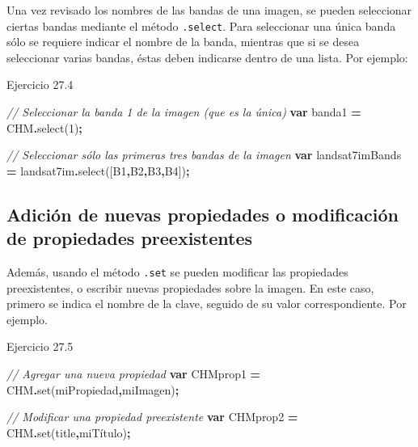 \documentclass[
  12pt,
  letterpaper,
  twoside]{book}
\newenvironment{Shaded}{\begin{snugshade}}{\end{snugshade}}
\newcommand{\CommentTok}[1]{\textcolor[rgb]{0.56,0.35,0.01}{\textit{#1}}}
\newcommand{\FunctionTok}[1]{\textcolor[rgb]{0.00,0.00,0.00}{#1}}
\newcommand{\KeywordTok}[1]{\textcolor[rgb]{0.13,0.29,0.53}{\textbf{#1}}}
\newcommand{\NormalTok}[1]{#1}
\newcommand{\OperatorTok}[1]{\textcolor[rgb]{0.81,0.36,0.00}{\textbf{#1}}}
\newcommand{\StringTok}[1]{\textcolor[rgb]{0.31,0.60,0.02}{#1}}
\begin{document}
Una vez revisado los nombres de las bandas de una imagen, se pueden seleccionar ciertas bandas mediante el método \texttt{.select}. Para seleccionar una única banda sólo se requiere indicar el nombre de la banda, mientras que si se desea seleccionar varias bandas, éstas deben indicarse dentro de una lista. Por ejemplo:

Ejercicio 27.4

\begin{Shaded}
\begin{Highlighting}[]
\CommentTok{// Seleccionar la banda 1 de la imagen (que es la única)}
\KeywordTok{var}\NormalTok{ banda1 }\OperatorTok{=}\NormalTok{ CHM}\OperatorTok{.}\FunctionTok{select}\NormalTok{(}\StringTok{\textquotesingle{}1\textquotesingle{}}\NormalTok{)}\OperatorTok{;}

\CommentTok{// Seleccionar sólo las primeras tres bandas de la imagen}
\KeywordTok{var}\NormalTok{ landsat7imBands }\OperatorTok{=}\NormalTok{ landsat7im}\OperatorTok{.}\FunctionTok{select}\NormalTok{([}\StringTok{\textquotesingle{}B1\textquotesingle{}}\OperatorTok{,}\StringTok{\textquotesingle{}B2\textquotesingle{}}\OperatorTok{,}\StringTok{\textquotesingle{}B3\textquotesingle{}}\OperatorTok{,}\StringTok{\textquotesingle{}B4\textquotesingle{}}\NormalTok{])}\OperatorTok{;}
\end{Highlighting}
\end{Shaded}

\hypertarget{adiciuxf3n-de-nuevas-propiedades-o-modificaciuxf3n-de-propiedades-preexistentes-1}{%
\subsection{Adición de nuevas propiedades o modificación de propiedades preexistentes}\label{adiciuxf3n-de-nuevas-propiedades-o-modificaciuxf3n-de-propiedades-preexistentes-1}}

Además, usando el método \texttt{.set} se pueden modificar las propiedades preexistentes, o escribir nuevas propiedades sobre la imagen. En este caso, primero se indica el nombre de la clave, seguido de su valor correspondiente. Por ejemplo.

Ejercicio 27.5

\begin{Shaded}
\begin{Highlighting}[]
\CommentTok{// Agregar una nueva propiedad}
\KeywordTok{var}\NormalTok{ CHMprop1 }\OperatorTok{=}\NormalTok{ CHM}\OperatorTok{.}\FunctionTok{set}\NormalTok{(}\StringTok{\textquotesingle{}miPropiedad\textquotesingle{}}\OperatorTok{,}\StringTok{\textquotesingle{}miImagen\textquotesingle{}}\NormalTok{)}\OperatorTok{;}

\CommentTok{// Modificar una propiedad preexistente}
\KeywordTok{var}\NormalTok{ CHMprop2 }\OperatorTok{=}\NormalTok{ CHM}\OperatorTok{.}\FunctionTok{set}\NormalTok{(title}\OperatorTok{,}\StringTok{\textquotesingle{}miTítulo\textquotesingle{}}\NormalTok{)}\OperatorTok{;}
\end{Highlighting}
\end{Shaded}
\end{document}

